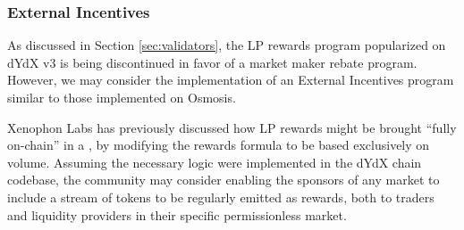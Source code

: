         \subsubsection{External Incentives}


            
            As discussed in Section \ref{sec:validators}, the LP rewards program popularized on dYdX v3 is being discontinued in favor of a market maker rebate program. However, we may consider the implementation of an External Incentives program similar to those implemented on Osmosis. 
            
            Xenophon Labs has previously discussed how LP rewards might be brought ``fully on-chain'' in a , by modifying the rewards formula to be based exclusively on volume. Assuming the necessary logic were implemented in the dYdX chain codebase, the community may consider enabling the sponsors of any market to include a stream of tokens to be regularly emitted as rewards, both to traders and liquidity providers in their specific permissionless market.

